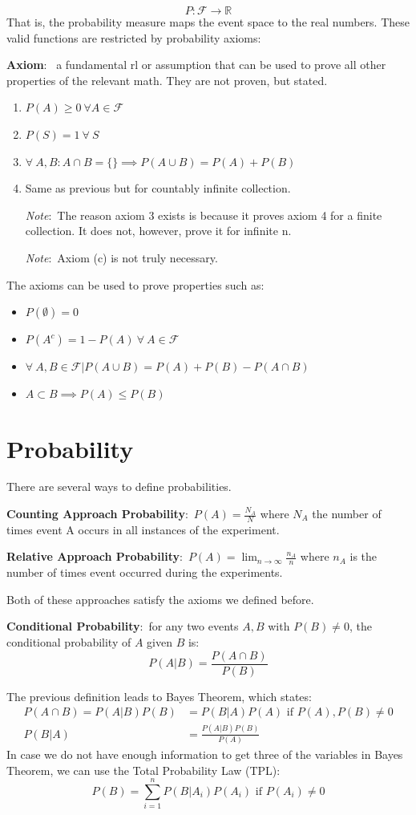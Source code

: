 \documentclass[nobib]{tufte-handout}
\newcommand{\defn}[2]{
        \begin{defbox}
        \noindent\textbf{#1}:\ #2
        \end{defbox}
}
\newcommand{\note}[1]{
        \begin{notebox}
        \noindent\textit{Note}:\ #1
        \end{notebox}
}
\begin{document}
\begin{enumerate}
    \begin{equation*}
        \mathit{P}:\mathcal{F} \rightarrow \mathbb{R}
    \end{equation*}
    That is, the probability measure maps the event space to the real numbers. These valid functions are restricted by probability axioms:
    \defn{Axiom}{ a fundamental rl or assumption that can be used to prove all other properties of the relevant math. They are not proven, but stated.}
    \begin{enumerate}
        \item $P(A) \geq 0 ~\forall A\in \mathcal{F}$
        \item $P(S) = 1 ~\forall~ S$
        \item $\forall~ A,B: A\cap B = \{\} \implies P(A\cup B)= P(A)+P(B)$
        \item Same as previous but for countably infinite collection.
        \note{The reason axiom 3 exists is because it proves axiom 4 for a finite collection. It does not, however, prove it for infinite n.}
        \note{Axiom (c) is not truly necessary.}
    \end{enumerate}
    The axioms can be used to prove properties such as:
    \begin{itemize}
        \item $P(\emptyset) = 0$
        \item $P(A^c) = 1-P(A) ~\forall~A\in\mathcal{F}$
        \item $\forall~A,B \in \mathcal{F}| P(A\cup B) = P(A)+P(B)-P(A\cap B)$
        \item $A \subset B \implies P(A) \leq P(B)$
    \end{itemize}
\end{enumerate}
\section{Probability}
There are several ways to define probabilities.
\defn{Counting Approach Probability}{$P(A) = \frac{N_A}{N}$ where $N_A$ the number of times event A occurs in all instances of the experiment.}
\defn{Relative Approach Probability}{$P(A)=\lim_{n\rightarrow\infty}\frac{n_A}{n}$ where $n_A$ is the number of times event occurred during the experiments.}
Both of these approaches satisfy the axioms we defined before.
\defn{Conditional Probability}{for any two events $A,B$ with $P(B)\neq 0$, the conditional probability of $A$ given $B$ is:\begin{equation*}
    P(A|B) = \frac{P(A\cap B)}{P(B)}
\end{equation*}}
The previous definition leads to Bayes Theorem, which states:
\begin{align*}
    P(A\cap B) = P(A|B)P(B) &= P(B|A)P(A) \text{ if } P(A),P(B) \neq 0\\
    P(B|A) &= \frac{P(A|B)P(B)}{P(A)}
\end{align*}
In case we do not have enough information to get three of the variables in Bayes Theorem, we can use the Total Probability Law (TPL):
\begin{equation*}
    P(B) = \sum_{i=1}^{n}P(B|A_i)P(A_i) \text{ if } P(A_i)\neq 0
\end{equation*}
\end{document}
